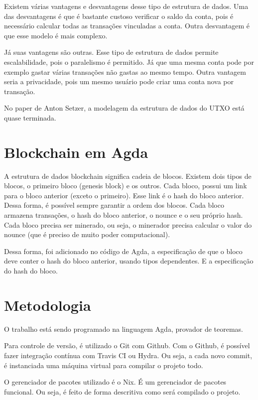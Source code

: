 \documentclass[12pt]{report}
\begin{document}
Existem várias vantagens e desvantagens desse tipo de estrutura de dados. Uma das desvantagens é que é bastante custoso verificar o saldo da conta, pois é necessário calcular todas as transações vinculadas a conta. Outra desvantagem é que esse modelo é mais complexo.

Já suas vantagens são outras. Esse tipo de estrutura de dados permite escalabilidade, pois o paralelismo é permitido. Já que uma mesma conta pode por exemplo gastar várias transações não gastas ao mesmo tempo. Outra vantagem seria a privacidade, pois um mesmo usuário pode criar uma conta nova por transação.

No paper de Anton Setzer, a modelagem da estrutura de dados do UTXO está quase terminada.

\section{Blockchain em Agda}

A estrutura de dados blockchain significa cadeia de blocos. Existem dois tipos de blocos, o primeiro bloco (genesis block) e os outros. Cada bloco, possui um link para o bloco anterior (exceto o primeiro). Esse link é o hash do bloco anterior. Dessa forma, é possível sempre garantir a ordem dos blocos. Cada bloco armazena transações, o hash do bloco anterior, o nounce e o seu próprio hash. Cada bloco precisa ser minerado, ou seja, o minerador precisa calcular o valor do nounce (que é preciso de muito poder computacional).

Dessa forma, foi adicionado no código de Agda, a especificação de que o bloco deve conter o hash do bloco anterior, usando tipos dependentes. E a especificação do hash do bloco.


\section{Metodologia}

O trabalho está sendo programado na linguagem Agda, provador de teoremas. 

Para controle de versão, é utilizado o Git com Github.
Com o Github, é possível fazer integração contínua com Travis CI ou Hydra.
Ou seja, a cada novo commit, é instanciada uma máquina virtual para compilar o projeto todo.

O gerenciador de pacotes utilizado é o Nix. É um gerenciador de pacotes funcional. 
Ou seja, é feito de forma descritiva como será compilado o projeto.
\end{document}
